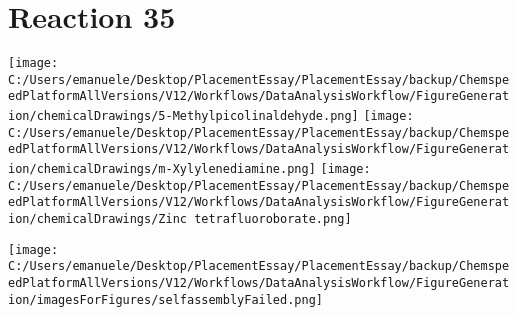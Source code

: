 \documentclass{article}%
\begin{document}
\section*{Reaction 35}%
%
\begin{scheme}[H]%
\begin{minipage}{0.5\textwidth}%
\texttt{[image: C:/Users/emanuele/Desktop/PlacementEssay/PlacementEssay/backup/ChemspeedPlatformAllVersions/V12/Workflows/DataAnalysisWorkflow/FigureGeneration/chemicalDrawings/5-Methylpicolinaldehyde.png]}%
\texttt{[image: C:/Users/emanuele/Desktop/PlacementEssay/PlacementEssay/backup/ChemspeedPlatformAllVersions/V12/Workflows/DataAnalysisWorkflow/FigureGeneration/chemicalDrawings/m-Xylylenediamine.png]}%
\texttt{[image: C:/Users/emanuele/Desktop/PlacementEssay/PlacementEssay/backup/ChemspeedPlatformAllVersions/V12/Workflows/DataAnalysisWorkflow/FigureGeneration/chemicalDrawings/Zinc tetrafluoroborate.png]}%
\end{minipage}%
\begin{minipage}{0.5\textwidth}%
\begin{center}%
\texttt{[image: C:/Users/emanuele/Desktop/PlacementEssay/PlacementEssay/backup/ChemspeedPlatformAllVersions/V12/Workflows/DataAnalysisWorkflow/FigureGeneration/imagesForFigures/selfassemblyFailed.png]}%
\end{center}%
\end{minipage}%
\caption{Self-assembly of components 3, 18, with Zinc(II) in a 3.0:1.5:1.0 molar ratio in CH$_3$CN at 60\textdegree C for 40h. These are the reagents (starting materials) for reaction 35.}%
\end{scheme}%
\end{document}
